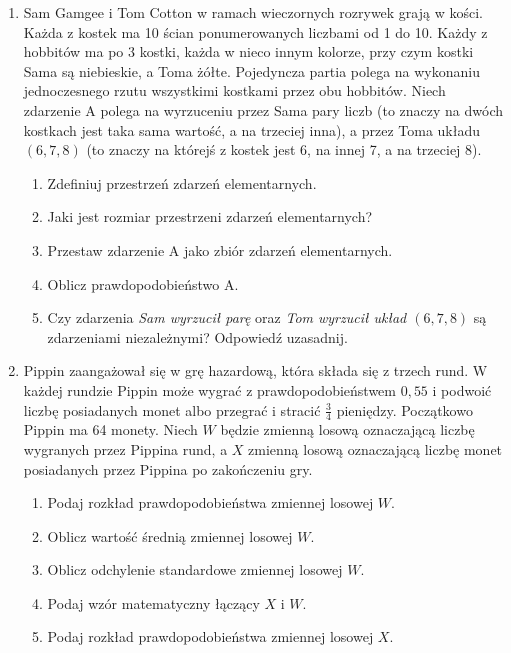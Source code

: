 \documentclass[twoside]{mwart}
\begin{document}
\begin{enumerate}
\item Sam Gamgee i Tom Cotton w ramach wieczornych rozrywek grają w kości.
Każda z kostek ma 10 ścian ponumerowanych liczbami od 1 do 10.
Każdy z hobbitów ma po 3 kostki, każda w nieco innym kolorze, przy czym kostki Sama są niebieskie, a Toma żółte.
Pojedyncza partia polega na wykonaniu jednoczesnego rzutu wszystkimi kostkami przez obu hobbitów.
Niech zdarzenie A polega na wyrzuceniu przez Sama pary liczb (to znaczy na dwóch kostkach jest taka sama wartość, a na trzeciej inna), a przez Toma układu $(6,7,8)$ (to znaczy na którejś z kostek jest 6, na innej 7, a na trzeciej 8).
\begin{enumerate}
\item Zdefiniuj przestrzeń zdarzeń elementarnych.
\item Jaki jest rozmiar przestrzeni zdarzeń elementarnych?
\item Przestaw zdarzenie A jako zbiór zdarzeń elementarnych.
\item Oblicz prawdopodobieństwo A.
\item Czy zdarzenia \emph{Sam wyrzucił parę} oraz \emph{Tom wyrzucił układ $(6,7,8)$} są zdarzeniami niezależnymi? Odpowiedź uzasadnij.
\end{enumerate}

\item Pippin zaangażował się w grę hazardową, która składa się z trzech rund.
W każdej rundzie Pippin może wygrać z prawdopodobieństwem $0{,}55$ i podwoić liczbę posiadanych monet albo przegrać i stracić $\frac{3}{4}$ pieniędzy.
Początkowo Pippin ma 64 monety.
Niech $W$ będzie zmienną losową oznaczającą liczbę wygranych przez Pippina rund, a $X$ zmienną losową oznaczającą liczbę monet posiadanych przez Pippina po zakończeniu gry.
\begin{enumerate}
\item Podaj rozkład prawdopodobieństwa zmiennej losowej $W$.
\item Oblicz wartość średnią zmiennej losowej $W$.
\item Oblicz odchylenie standardowe zmiennej losowej $W$.
\item Podaj wzór matematyczny łączący $X$ i $W$.
\item Podaj rozkład prawdopodobieństwa zmiennej losowej $X$.
\end{enumerate}


\end{enumerate}
\end{document}
